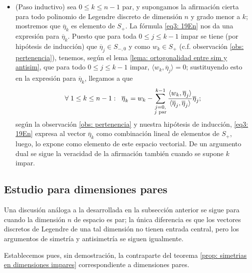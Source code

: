 \begin{itemize}
\item (Paso inductivo) sea $0 \leq k \leq n-1$ par, y
supongamos la afirmación cierta para todo polinomio de Legendre
discreto de dimensión $n$ y grado menor a $k$;
mostremos que $\overline{\eta}_{k}$ es elemento de $S_{+}$.
La fórmula \eqref{eq3: 19En} nos da una expresión
para $\overline{\eta}_{k}$.
Puesto que
para toda $0 \leq j \leq k-1$ impar se tiene 
(por hipótesis de inducción) 
que $\overline{\eta}_{j} \in S_{-,0}$
y como $w_{k} \in S_{+}$ (c.f. observación 
\ref{obs: pertenencia}), tenemos, según el lema
\ref{lema: ortogonalidad entre sim y antisim}, que
para todo $0 \leq j \leq k-1$ impar, 
$\langle w_{k}, \overline{\eta}_{j} \rangle=0$;
sustituyendo esto en la expresión para 
$\overline{\eta}_{k}$, llegamos a que
\begin{equation}
\label{eq3: 19En}
\forall \hspace{0.1cm} 1 \leq k \leq n-1: 
\hspace{0.2cm}
\overline{\eta}_{k}= w_{k}-
\sum\limits_{
\substack{ {j=0}, \\  {j\text{ par}}}
}^{k-1}
\frac{\langle w_{k}, \overline{\eta}_{j} \rangle}
{\langle \overline{\eta}_{j}, \overline{\eta}_{j} \rangle}\overline{\eta}_{j}
;
\end{equation}
según la observación \ref{obs: pertenencia}
y nuestra hipótesis de inducción, 
\eqref{eq3: 19En} expresa al vector 
$\overline{\eta}_{k}$ como combinación lineal
de elementos de $S_{+}$, luego, lo expone como
elemento de este espacio vectorial. De un argumento
dual se sigue la veracidad de la afirmación también
cuando se supone $k$ impar.
\end{itemize}
\QEDB
\vspace{0.2cm}

\subsection{Estudio para dimensiones pares}
Una discusión análoga a la desarrollada en la subsección
anterior se sigue para cuando la dimensión $n$ de espacio
es par; la única diferencia es que los vectores discretos
de Legendre de una tal dimensión no tienen entrada central,
pero los argumentos de simetría y antisimetría se siguen
igualmente.

Establecemos pues, sin demostración, 
la contraparte del teorema
\ref{prop: simetrias en dimensiones impares} 
correspondiente a dimensiones pares.



